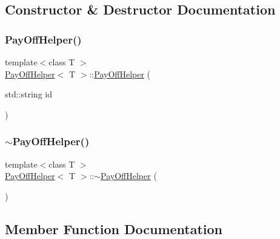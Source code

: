 \subsection{Constructor \& Destructor Documentation}
\hypertarget{classPayOffHelper_ad2e199bb2484af9ecae7fc1f53b13e80}{}\label{classPayOffHelper_ad2e199bb2484af9ecae7fc1f53b13e80} 
\subsubsection{\texorpdfstring{Pay\+Off\+Helper()}{PayOffHelper()}}
{\footnotesize\ttfamily template$<$class T $>$ \\
\hyperlink{classPayOffHelper}{Pay\+Off\+Helper}$<$ T $>$\+::\hyperlink{classPayOffHelper}{Pay\+Off\+Helper} (\begin{DoxyParamCaption}\item[{std\+::string}]{id }\end{DoxyParamCaption})}

\hypertarget{classPayOffHelper_a7cb8349617e00ac901e38d60f5b77c94}{}\label{classPayOffHelper_a7cb8349617e00ac901e38d60f5b77c94} 
\subsubsection{\texorpdfstring{$\sim$\+Pay\+Off\+Helper()}{~PayOffHelper()}}
{\footnotesize\ttfamily template$<$class T $>$ \\
\hyperlink{classPayOffHelper}{Pay\+Off\+Helper}$<$ T $>$\+::$\sim$\hyperlink{classPayOffHelper}{Pay\+Off\+Helper} (\begin{DoxyParamCaption}{ }\end{DoxyParamCaption})\hspace{0.3cm}{\ttfamily [inline]}}



\subsection{Member Function Documentation}
\hypertarget{classPayOffHelper_a794475ca98e3909feb3624a349233b1d}{}\label{classPayOffHelper_a794475ca98e3909feb3624a349233b1d} 
